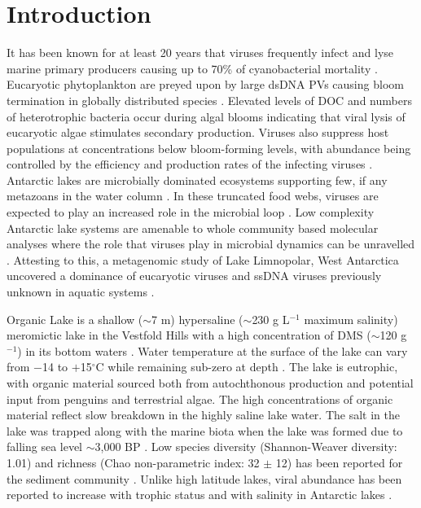\section{Introduction}
\acresetall
It has been known for at least 20 years that viruses frequently infect and lyse marine primary producers causing up to 70\% of cyanobacterial mortality \cite{Proctor1990,Suttle1990}.
Eucaryotic phytoplankton are preyed upon by large ds\textsc{DNA} \acp{PV} causing bloom termination in globally distributed species \cite{Nagasaki1994, Jacobsen1996, Wilson2002, Martinez-Martinez2007}.
Elevated levels of \ac{DOC} \cite{Eberlein1985} and numbers of heterotrophic bacteria \cite{Davidson1992, Bratbak1998b, Castberg2001} occur during algal blooms indicating that viral lysis of eucaryotic algae stimulates secondary production. 
Viruses also suppress host populations at concentrations below bloom-forming levels, with abundance being controlled by the efficiency and production rates of the infecting viruses \cite{Larsen2001, Bouvier2007}. 
Antarctic lakes are microbially dominated ecosystems supporting few, if any metazoans in the water column \cite{Laybourn-Parry1997}. 
In these truncated food webs, viruses are expected to play an increased role in the microbial loop \cite{Madan2005}. 
Low complexity Antarctic lake systems are amenable to whole community based molecular analyses where the role that viruses play in microbial dynamics can be unravelled \cite{Lauro2011}. 
Attesting to this, a metagenomic study of Lake Limnopolar, West Antarctica uncovered a dominance of eucaryotic viruses and ss\textsc{DNA} viruses previously unknown in aquatic systems \cite{Lopez-Bueno2009}. 
 
Organic Lake is a shallow ($\sim$7 m) hypersaline ($\sim$230 g L$^{-1}$ maximum salinity) meromictic lake in the Vestfold Hills with a high concentration of \ac{DMS} ($\sim$120 \textmu{}g $^{-1}$) in its bottom waters \cite{Gibson1991, Roberts1993b}. 
Water temperature at the surface of the lake can vary from $-$14 to $+$15$^{\circ}$C while remaining sub-zero at depth \cite{Franzmann1987b, Gibson1999}. 
The lake is eutrophic, with organic material sourced both from autochthonous production and potential input from penguins and terrestrial algae. 
The high concentrations of organic material reflect slow breakdown in the highly saline lake water. 
The salt in the lake was trapped along with the marine biota when the lake was formed due to falling sea level $\sim$3,000 BP \cite{Bird1991, Zwartz1998}. 
Low species diversity (Shannon-Weaver diversity: 1.01) and richness (Chao non-parametric index: 32 $\pm$ 12) has been reported for the sediment community \cite{Bowman2000b}. 
Unlike high latitude lakes, viral abundance has been reported to increase with trophic status \cite{Madan2005} and with salinity in Antarctic lakes \cite{Laybourn-Parry2001}. 

